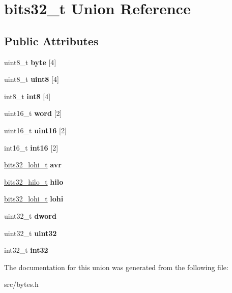 \hypertarget{unionbits32__t}{}\section{bits32\+\_\+t Union Reference}
\label{unionbits32__t}
\subsection*{Public Attributes}
\begin{DoxyCompactItemize}
\item 
\hypertarget{unionbits32__t_abe0797e0eb5f1bf589b9c038a78bfbdc}{}\label{unionbits32__t_abe0797e0eb5f1bf589b9c038a78bfbdc} 
uint8\+\_\+t {\bfseries byte} \mbox{[}4\mbox{]}
\item 
\hypertarget{unionbits32__t_ade6279a4e44ee0b5ea958f63dbf4388d}{}\label{unionbits32__t_ade6279a4e44ee0b5ea958f63dbf4388d} 
uint8\+\_\+t {\bfseries uint8} \mbox{[}4\mbox{]}
\item 
\hypertarget{unionbits32__t_ac3774810575fe4c355270f7292df3035}{}\label{unionbits32__t_ac3774810575fe4c355270f7292df3035} 
int8\+\_\+t {\bfseries int8} \mbox{[}4\mbox{]}
\item 
\hypertarget{unionbits32__t_a6463efc291982c8a0a0e5fddc4dae8d8}{}\label{unionbits32__t_a6463efc291982c8a0a0e5fddc4dae8d8} 
uint16\+\_\+t {\bfseries word} \mbox{[}2\mbox{]}
\item 
\hypertarget{unionbits32__t_a9b517f749570fa0505ecb07a59d7de04}{}\label{unionbits32__t_a9b517f749570fa0505ecb07a59d7de04} 
uint16\+\_\+t {\bfseries uint16} \mbox{[}2\mbox{]}
\item 
\hypertarget{unionbits32__t_afdc70028d0a79d25b72b5674aa9123dd}{}\label{unionbits32__t_afdc70028d0a79d25b72b5674aa9123dd} 
int16\+\_\+t {\bfseries int16} \mbox{[}2\mbox{]}
\item 
\hypertarget{unionbits32__t_ab3f205911435f4da69f077493a814cb4}{}\label{unionbits32__t_ab3f205911435f4da69f077493a814cb4} 
\hyperlink{structbits32__lohi__s}{bits32\+\_\+lohi\+\_\+t} {\bfseries avr}
\item 
\hypertarget{unionbits32__t_acb8df3f2372a628f21d4ba07e471ac15}{}\label{unionbits32__t_acb8df3f2372a628f21d4ba07e471ac15} 
\hyperlink{structbits32__hilo__s}{bits32\+\_\+hilo\+\_\+t} {\bfseries hilo}
\item 
\hypertarget{unionbits32__t_ad7cf7f31700e142c10e2e60c27131d69}{}\label{unionbits32__t_ad7cf7f31700e142c10e2e60c27131d69} 
\hyperlink{structbits32__lohi__s}{bits32\+\_\+lohi\+\_\+t} {\bfseries lohi}
\item 
\hypertarget{unionbits32__t_a894d610b65f05a414d2377e9e46b1c1a}{}\label{unionbits32__t_a894d610b65f05a414d2377e9e46b1c1a} 
uint32\+\_\+t {\bfseries dword}
\item 
\hypertarget{unionbits32__t_ae399904fbef319292e29946f49d6843c}{}\label{unionbits32__t_ae399904fbef319292e29946f49d6843c} 
uint32\+\_\+t {\bfseries uint32}
\item 
\hypertarget{unionbits32__t_aa272b73bd27c8d36e55668bf8d74682c}{}\label{unionbits32__t_aa272b73bd27c8d36e55668bf8d74682c} 
int32\+\_\+t {\bfseries int32}
\end{DoxyCompactItemize}


The documentation for this union was generated from the following file\+:\begin{DoxyCompactItemize}
\item 
src/bytes.\+h\end{DoxyCompactItemize}

